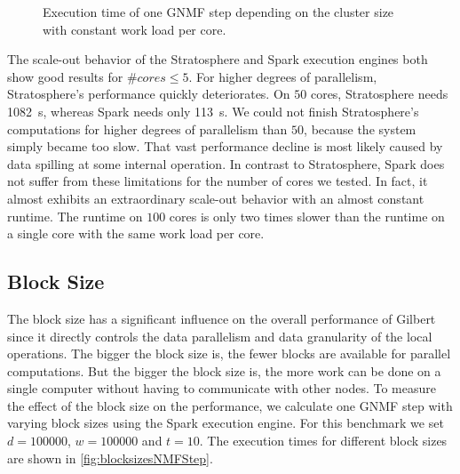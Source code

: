 \begin{figure}
	\centering
		\caption{Execution time of one GNMF step depending on the cluster size with constant work load per core.}
		\label{fig:nmfNodesRuntime}
\end{figure}

The scale-out behavior of the Stratosphere and Spark execution engines both show good results for $\#cores \le 5$.
For higher degrees of parallelism, Stratosphere's performance quickly deteriorates.
On $50$ cores, Stratosphere needs \SI{1082}{\second}, whereas Spark needs only \SI{113}{\second}.
We could not finish Stratosphere's computations for higher degrees of parallelism than $50$, because the system simply became too slow.
That vast performance decline is most likely caused by data spilling at some internal operation.
In contrast to Stratosphere, Spark does not suffer from these limitations for the number of cores we tested.
In fact, it almost exhibits an extraordinary scale-out behavior with an almost constant runtime.
The runtime on $100$ cores is only two times slower than the runtime on a single core with the same work load per core.

\subsection{Block Size}

The block size has a significant influence on the overall performance of Gilbert since it directly controls the data parallelism and data granularity of the local operations.
The bigger the block size is, the fewer blocks are available for parallel computations.
But the bigger the block size is, the more work can be done on a single computer without having to communicate with other nodes.
To measure the effect of the block size on the performance, we calculate one GNMF step with varying block sizes using the Spark execution engine.
For this benchmark we set $d=100000$, $w = 100000$ and $t = 10$.
The execution times for different block sizes are shown in \cref{fig:blocksizesNMFStep}.

